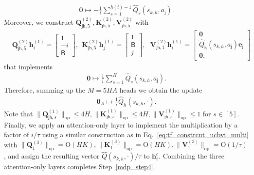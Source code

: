 \documentclass[10pt]{article}
\renewcommand{\bar}{\overline}
\newcommand{\lops}[1]{\|{#1}\|_{\mathrm{op}}}
\newcommand{\<}{\left\langle}
\renewcommand{\>}{\right\rangle}
\renewcommand{\bQ}{\mathbf{Q}}
\newcommand{\bzero}{{\mathbf 0}}
\newcommand{\partc}{{c}}
\newcommand{\temp}{{\tau}}
\newcommand{\state}{{s}}
\newcommand{\action}{{a}}
\newcommand{\Numepi}{{K}}
\newcommand{\horizon}{{H}}
\renewcommand{\horizon}{{H}}
\newcommand{\head}{{M}}
\newcommand{\tfthres}{{\mathsf{B}}}
\newcommand{\Numact}{{A}}
\newcommand{\Qfun}{{Q}}
\newcommand{\estQfun}{{\widehat{\Qfun}}}
\newcommand{\conO}{{\mathrm{O}}}
\def\bK{{\mathbf K}}
\def\bQ{{\mathbf Q}}
\def\bV{{\mathbf V}}
\def\be{{\mathbf e}}
\def\bh{{\mathbf h}}
\def\sj{{\mathsf{j}}}
\def\sh{{\mathsf{h}}}
\begin{document}
\begin{align*}
    \bzero\mapsto -\frac{1}{i}\sum_{s=1}^{\bar{h}(i)-1}{\estQfun_{s}(\state_{k,h},\action_\sj)}.
\end{align*}
Moreover, we construct
$\bQ_{\sj\sh,5}^{(2)},\bK_{\sj\sh,5}^{(2)},\bV_{\sj\sh,5}^{(2)}$ with
\begin{align*}
  & \bQ_{\sj\sh,5}^{(2)}\bh_i^{(1)} =\begin{bmatrix}
       1\\-i\\
       \tfthres
   \end{bmatrix},~~ \bK_{\sj\sh,5}^{(2)}\bh_j^{(1)} =\begin{bmatrix}
    1 \\\tfthres\\ j
   \end{bmatrix},~~~
   \bV_{\sj\sh,1}^{(2)}\bh_i^{(1)} =\begin{bmatrix}
       \bzero \\  \estQfun_\sh(\state_{k,h},\action_\sj)\be_{\sj}\\
       \bzero,
   \end{bmatrix}
\end{align*} that implements
\begin{align*}
    \bzero\mapsto \frac{1}{i}\sum_{s=1}^{\horizon}{\estQfun_{s}(\state_{k,h},\action_\sj)}.
\end{align*}
Therefore, summing up the $\head=5\horizon\Numact$ heads we obtain the update
\begin{align*}
  \bzero_{\Numact}\mapsto \frac{1}{i}\estQfun_{h}(\state_{k,h},\cdot).
\end{align*}
Note that $\lops{\bQ_{\sj\sh,s}^{(1)}}\leq4\horizon,\lops{\bK_{\sj\sh,s}^{(1)}}\leq4\horizon,\lops{\bV_{\sj\sh,s}^{(1)}}\leq1$ for $s\in[5]$.
Finally, we apply an attention-only layer to implement the multiplication by a factor of $i/\temp$ using a similar construction as in Eq.~\eqref{eq:tf_constrcut_ucbvi_multi} with $\lops{\bQ_1^{(3)}}=\conO(\horizon\Numepi),\lops{\bK_1^{(3)}}=\conO(\horizon\Numepi),\lops{\bV_1^{(3)}}=\conO(1/\temp)$, and assign the resulting vector $\estQfun(\state_{k,h},\cdot)/\temp$ to $\bh_i^\partc$.
Combining the three attention-only layers completes Step~\ref{mdp_step4}.
\end{document}
